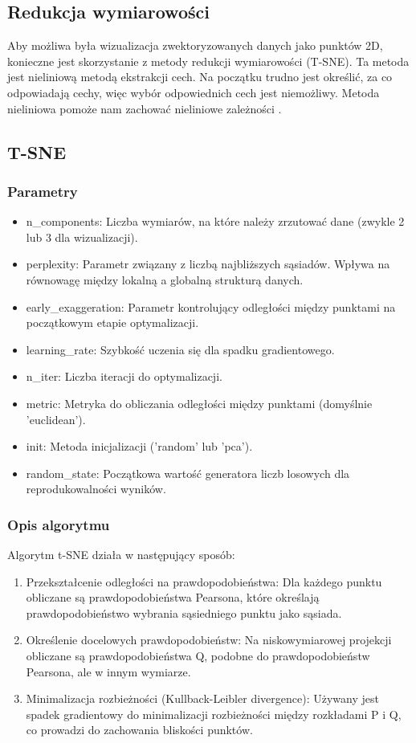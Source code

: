 	\subsection{Redukcja wymiarowości}
		Aby możliwa była wizualizacja zwektoryzowanych danych jako punktów 2D, konieczne jest skorzystanie z metody redukcji wymiarowości (T-SNE). Ta metoda jest nieliniową metodą ekstrakcji cech. Na początku trudno jest określić, za co odpowiadają cechy, więc wybór odpowiednich cech jest niemożliwy. Metoda nieliniowa pomoże nam zachować nieliniowe zależności \cite{t-sne}.
	
		
	\subsection{T-SNE}
	
		\subsubsection{Parametry}
			\begin{itemize}
				\item n\_components: Liczba wymiarów, na które należy zrzutować dane (zwykle 2 lub 3 dla wizualizacji).
				\item perplexity: Parametr związany z liczbą najbliższych sąsiadów. Wpływa na równowagę między lokalną a globalną strukturą danych.
				\item early\_exaggeration: Parametr kontrolujący odległości między punktami na początkowym etapie optymalizacji.
				\item learning\_rate: Szybkość uczenia się dla spadku gradientowego.
				\item n\_iter: Liczba iteracji do optymalizacji.
				\item metric: Metryka do obliczania odległości między punktami (domyślnie 'euclidean').
				\item init: Metoda inicjalizacji ('random' lub 'pca').			
				\item random\_state: Początkowa wartość generatora liczb losowych dla reprodukowalności wyników.
			\end{itemize}				
		
		\subsubsection{Opis algorytmu}
			Algorytm t-SNE działa w następujący sposób: 
			\begin{enumerate}
				\item Przekształcenie odległości na prawdopodobieństwa: Dla każdego punktu obliczane są prawdopodobieństwa Pearsona, które określają prawdopodobieństwo wybrania sąsiedniego punktu jako sąsiada.
				\item Określenie docelowych prawdopodobieństw: Na niskowymiarowej projekcji obliczane są prawdopodobieństwa Q, podobne do prawdopodobieństw Pearsona, ale w innym wymiarze.
				\item Minimalizacja rozbieżności (Kullback-Leibler divergence): Używany jest spadek gradientowy do minimalizacji rozbieżności między rozkładami P i Q, co prowadzi do zachowania bliskości punktów.
			\end{enumerate}
			
